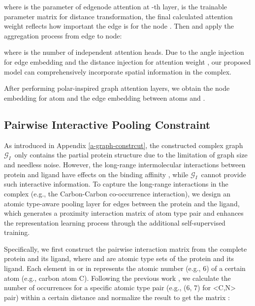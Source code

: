 \documentclass[sigconf]{acmart}
\newcommand{\graph}{\ensuremath{\mathcal{G}_I}}
\begin{document}
where  is the parameter of edgenode attention at -th layer,  is the trainable parameter matrix for distance transformation, the final calculated attention weight  reflects how important the edge  is for the node . Then  and apply the aggregation process from edge to node:

where  is the number of independent attention heads. Due to the angle injection for edge embedding  and the distance injection for attention weight , our proposed model can comprehensively incorporate spatial information in the complex.

After performing  polar-inspired graph attention layers, we obtain the node embedding  for atom  and the edge embedding  between atoms  and .

\subsection{Pairwise Interactive Pooling Constraint}
As introduced in Appendix \ref{a-graph-constrcut}, the constructed complex graph \graph \ only contains the partial protein structure due to the limitation of graph size and needless noise. However, the long-range intermolecular interactions between protein and ligand have effects on the binding affinity \cite{ballester2010machine, leckband1992long}, while \graph \ cannot provide such interactive information. To capture the long-range interactions in the complex (e.g., the Carbon-Carbon co-occurrence interaction), we design an atomic type-aware pooling layer for edges between the protein and the ligand, which generates a proximity interaction matrix of atom type pair and enhances the representation learning process through the additional self-supervised training. 

Specifically, we first construct the pairwise interaction matrix  from the complete protein and its ligand, where  and  are atomic type sets of the protein and its ligand. Each element  in  or  in  represents the atomic number (e.g., 6) of a certain atom (e.g., carbon atom C). Following the previous work \cite{ballester2010machine}, we calculate the number of occurrences for a specific atomic type pair  (e.g., (6, 7) for <C,N> pair) within a certain distance and normalize the result to get the matrix :
\end{document}
